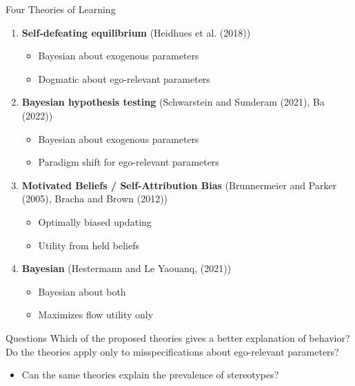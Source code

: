 \documentclass[aspectratio=169]{beamer}
\begin{document}
\begin{frame}{Four Theories of Learning}
    
    \begin{enumerate}

        \item \textbf{Self-defeating equilibrium} (Heidhues et al. (2018)) \\
        \begin{itemize}
            \item Bayesian about exogenous parameters
            \item Dogmatic about ego-relevant parameters
        \end{itemize}
        \bigskip

        \item \textbf{Bayesian hypothesis testing} (Schwarstein and Sunderam (2021), Ba (2022))\\
        \begin{itemize}
            \item Bayesian about exogenous parameters 
            \item Paradigm shift for ego-relevant parameters
        \end{itemize}
        \bigskip

        \item \textbf{Motivated Beliefs / Self-Attribution Bias} (Brunnermeier and Parker (2005), Bracha and Brown (2012)) \\
        \begin{itemize}
            \item Optimally biased updating
            \item Utility from held beliefs 
        \end{itemize}
        \bigskip

        \item \textbf{Bayesian} (Hestermann and Le Yaouanq, (2021))\\
        \begin{itemize}
            \item Bayesian about both 
            \item Maximizes flow utility only
        \end{itemize}

    \end{enumerate}
    
\end{frame}

\begin{frame}{Questions}
    Which of the proposed theories gives a better explanation of behavior?\\
    \bigskip
    Do the theories apply only to misspecifications about ego-relevant parameters?\\
    \begin{itemize}
        \item Can the same theories explain the prevalence of stereotypes?
        
    \end{itemize}
\end{frame}
\end{document}
